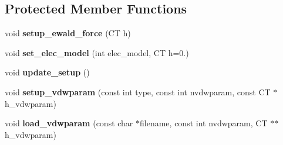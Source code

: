 \subsection*{Protected Member Functions}
\begin{DoxyCompactItemize}
\item 
\hypertarget{classCudaPMEDirectForce_af8f3d155802b9cd8807acd32a1502854}{}\label{classCudaPMEDirectForce_af8f3d155802b9cd8807acd32a1502854} 
void {\bfseries setup\+\_\+ewald\+\_\+force} (CT h)
\item 
\hypertarget{classCudaPMEDirectForce_ac2921fbfcf6a69296b3a4f0113ba2ed6}{}\label{classCudaPMEDirectForce_ac2921fbfcf6a69296b3a4f0113ba2ed6} 
void {\bfseries set\+\_\+elec\+\_\+model} (int elec\+\_\+model, CT h=0.)
\item 
\hypertarget{classCudaPMEDirectForce_a5eed2ed3e8255d16743912ffeebe69e2}{}\label{classCudaPMEDirectForce_a5eed2ed3e8255d16743912ffeebe69e2} 
void {\bfseries update\+\_\+setup} ()
\item 
\hypertarget{classCudaPMEDirectForce_a6d4629978da5717a081753a42c11ce1a}{}\label{classCudaPMEDirectForce_a6d4629978da5717a081753a42c11ce1a} 
void {\bfseries setup\+\_\+vdwparam} (const int type, const int nvdwparam, const CT $\ast$h\+\_\+vdwparam)
\item 
\hypertarget{classCudaPMEDirectForce_acda909dc533973ffa6d52a2b0a224fd3}{}\label{classCudaPMEDirectForce_acda909dc533973ffa6d52a2b0a224fd3} 
void {\bfseries load\+\_\+vdwparam} (const char $\ast$filename, const int nvdwparam, CT $\ast$$\ast$h\+\_\+vdwparam)
\end{DoxyCompactItemize}
